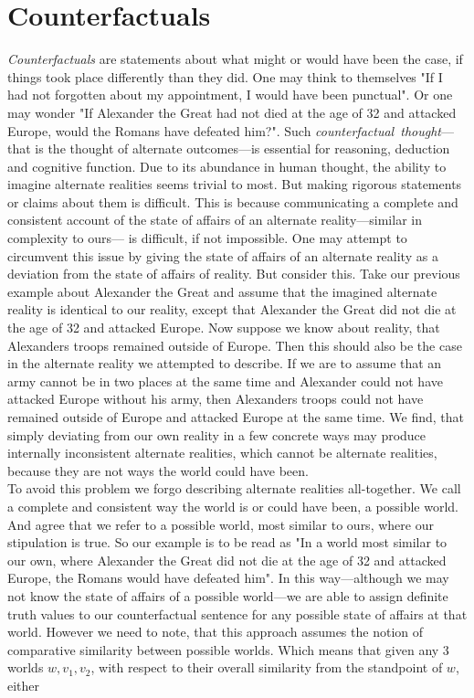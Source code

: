 \documentclass[a4paper,american]{paper}
\theoremstyle{definition}\newtheorem{definition}{Definition}
\begin{document}
\section{Counterfactuals}
\textit{Counterfactuals} are statements about what might or would have been the case, if things took place differently than they did. One may think to themselves "If I had not forgotten about my appointment, I would have been punctual". Or one may wonder "If Alexander the Great had not died at the age of 32 and attacked Europe, would the Romans have defeated him?". Such \textit{counterfactual~thought}---that is the thought of alternate outcomes---is essential for reasoning, deduction and cognitive function. \cite{byrne_counterfactual_2016} Due to its abundance in human thought, the ability to imagine alternate realities seems trivial to most. But making rigorous statements or claims about them is difficult. This is because communicating a complete and consistent account of the state of affairs of an alternate reality---similar in complexity to ours--- is difficult, if not impossible. One may attempt to circumvent this issue by giving the state of affairs of an alternate reality as a deviation from the state of affairs of reality. But consider this. 
Take our previous example about Alexander the Great and assume that the imagined alternate reality is identical to our reality, except that Alexander the Great did not die at the age of 32 and attacked Europe. Now suppose we know about reality, that Alexanders troops remained outside of Europe. Then this should also be the case in the alternate reality we attempted to describe. If we are to assume that an army cannot be in two places at the same time and Alexander could not have attacked Europe without his army, then Alexanders troops could not have remained outside of Europe and attacked Europe at the same time.
We find, that simply deviating from our own reality in a few concrete ways may produce internally inconsistent alternate realities, which cannot be alternate realities, because they are not ways the world could have been.\\
To avoid this problem we forgo describing alternate realities all-together. We call a complete and consistent way the world is or could have been, a possible world. And agree that we refer to a possible world, most similar to ours, where our stipulation is true. So our example is to be read as "In a world most similar to our own, where Alexander the Great did not die at the age of 32 and attacked Europe, the Romans would have defeated him". In this way---although we may not know the state of affairs of a possible world---we are able to assign definite truth values to our counterfactual sentence for any possible state of affairs at that world. However we need to note, that this approach assumes the notion of comparative similarity between possible worlds. Which means that given any 3 worlds $w,v_1,v_2$, with respect to their overall similarity from the standpoint of $w$, either
\end{document}
